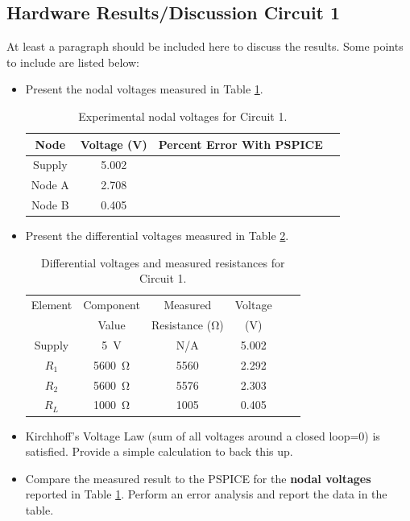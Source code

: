 \documentclass[11pt]{article}
\begin{document}
\subsection{Hardware Results/Discussion Circuit 1}	
  At least a paragraph should be included here to discuss the results. Some points to include are listed below:
\begin{itemize}
	\item Present the nodal voltages measured in Table \ref{Table:ResultsCircuit1}.
		\begin{table}[h!]
			\centering
			\caption{Experimental nodal voltages for Circuit 1.}
			\label{Table:ResultsCircuit1}
			\begin{tabular}{|c||c|c|c|}
				\hline
			Node & Voltage (\si{\volt}) & Percent Error With PSPICE \\
			\hline
			Supply & 5.002 &\\	 
			\hline 
			Node A & 2.708 &\\	 
			\hline
			Node B & 0.405 &\\	 
			\hline			
			\end{tabular}
		\end{table}
	\item Present the differential voltages measured in Table \ref{Table:DerivedResultsCircuit1}.  %
			\begin{table}[h!]
				\centering
				\caption{Differential voltages and measured resistances for Circuit 1.}
				\label{Table:DerivedResultsCircuit1}
				\begin{tabular}{|c||c|c|c|c|c|}
					\hline
					Element & Component & Measured & Voltage  \\
					& Value & Resistance (\si{\ohm}) & (\si{\volt})     \\
				
					\hline
					Supply & 5~\si{\volt} & N/A & 5.002 \\	 
					\hline 
					$R_1$ & 5600~\si{\ohm} & 5560 & 2.292 \\	 
					\hline
					$R_2$ & 5600~\si{\ohm} & 5576 & 2.303 \\
					\hline
					$R_L$ & 1000~\si{\ohm} & 1005 & 0.405 \\
					\hline
				\end{tabular}
			\end{table}
	\item Kirchhoff's Voltage Law (sum of all voltages around a closed loop=0) is satisfied.   Provide a simple calculation to back this up.
	\item Compare the measured result to the PSPICE for the \textbf{nodal voltages} reported in Table \ref{Table:ResultsCircuit1}. Perform an error analysis and report the data in the table.
\end{itemize}
\end{document}
